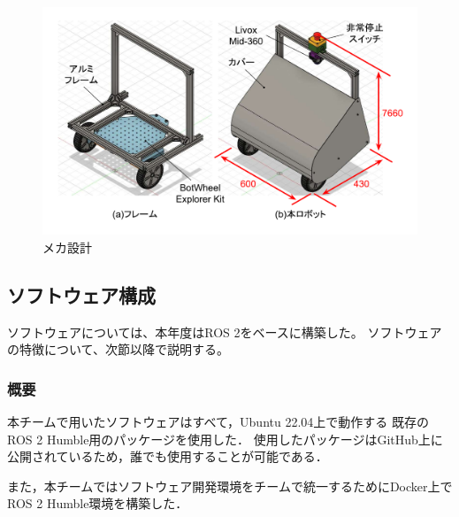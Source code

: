 \documentclass[twocolumn,9pt]{jsproceedings}
\begin{document}
\begin{figure}[h]
  \begin{center}
    \includegraphics[width=1.0\linewidth]{figs/robot_flame.pdf}
    \caption{メカ設計}
    \label{fig:robot_flame}
  \end{center}
\end{figure}

\subsection{ソフトウェア構成}

ソフトウェアについては、本年度はROS 2をベースに構築した。
ソフトウェアの特徴について、次節以降で説明する。


\subsubsection{概要}
本チームで用いたソフトウェアはすべて，Ubuntu 22.04上で動作する
既存のROS 2 Humble用のパッケージを使用した．
使用したパッケージはGitHub上に公開されているため，誰でも使用することが可能である．

また，本チームではソフトウェア開発環境をチームで統一するためにDocker上でROS 2 Humble環境を構築した．
\end{document}
